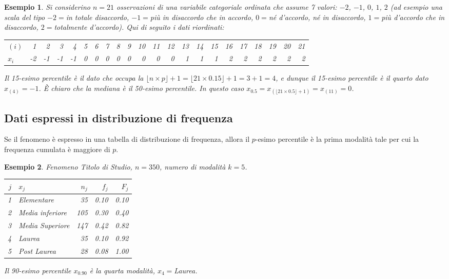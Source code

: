 \documentclass[
  11pt,
]{book}
\theoremstyle{mytheoremstyle}
\theoremstyle{mydefstyle}
\newtheorem{example}{{Esempio}}[section]
\begin{document}
\begin{example}
Si considerino \(n=21\) osservazioni di una variabile categoriale ordinata che assume 7 valori: \(-2\), \(-1\), \(0\), \(1\), \(2\) (ad esempio una scala del tipo \(-2=\)\emph{in totale disaccordo}, \(-1=\)\emph{più in disaccordo che in accordo}, \(0=\)\emph{né d'accordo, né in disaccordo}, \(1=\)\emph{più d'accordo che in disaccordo}, \(2=\)\emph{totalmente d'accordo}). Qui di seguito i dati riordinati:

\begin{tabular}{lrrrrrrrrrrrrrrrrrrrrr}
\toprule
$(i)$ & 1 & 2 & 3 & 4 & 5 & 6 & 7 & 8 & 9 & 10 & 11 & 12 & 13 & 14 & 15 & 16 & 17 & 18 & 19 & 20 & 21\\
$x_i$ & -2 & -1 & -1 & -1 & 0 & 0 & 0 & 0 & 0 & 0 & 0 & 0 & 1 & 1 & 1 & 2 & 2 & 2 & 2 & 2 & 2\\
\bottomrule
\end{tabular}

Il 15-esimo percentile è il dato che occupa la \(\lfloor n\times p \rfloor+1 =\lfloor 21\times 0.15\rfloor+1= 3+1=4\), e dunque il 15-esimo percentile è il quarto dato \(x_{(4)}=-1\).
È chiaro che la mediana è il 50-esimo percentile. In questo caso \(x_{0.5}=x_{\left(\lfloor21\times 0.5\rfloor +1\right)}=x_{(11)}=0\).
\end{example}

\subsection{Dati espressi in distribuzione di frequenza}\label{dati-espressi-in-distribuzione-di-frequenza-1}

Se il fenomeno è espresso in una tabella di distribuzione di frequenza, allora il \(p\)-esimo percentile è la prima modalità tale per cui la frequenza cumulata è maggiore di \(p\).

\begin{example}
Fenomeno \emph{Titolo di Studio}, \(n=350\), numero di modalità \(k=5\).

\begin{tabular}{rlrrr}
\toprule
$j$ & $x_{j}$ & $n_j$ & $f_j$ & $F_j$\\
\midrule
1 & Elementare & 35 & 0.10 & 0.10\\
2 & Media inferiore & 105 & 0.30 & 0.40\\
3 & Media Superiore & 147 & 0.42 & 0.82\\
4 & Laurea & 35 & 0.10 & 0.92\\
5 & Post Laurea & 28 & 0.08 & 1.00\\
\bottomrule
\end{tabular}

Il 90-esimo percentile \(x_{0.90}\) è la quarta modalità, \(x_{4}=\)Laurea.
\end{example}
\end{document}
